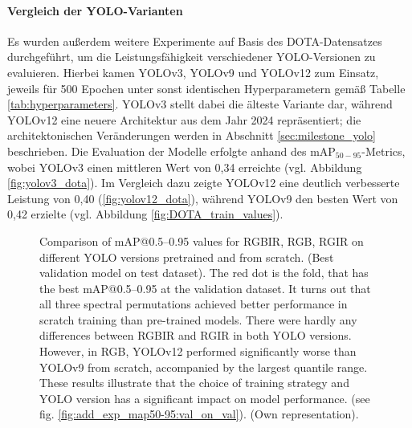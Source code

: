 \paragraph{Vergleich der YOLO-Varianten}
Es wurden außerdem weitere Experimente auf Basis des DOTA-Datensatzes durchgeführt, um die Leistungsfähigkeit verschiedener YOLO-Versionen zu evaluieren. Hierbei kamen YOLOv3, YOLOv9 und YOLOv12 zum Einsatz, jeweils für 500 Epochen unter sonst identischen Hyperparametern gemäß Tabelle \ref{tab:hyperparameters}. YOLOv3 stellt dabei die älteste Variante dar, während YOLOv12 eine neuere Architektur aus dem Jahr 2024 repräsentiert; die architektonischen Veränderungen werden in Abschnitt \ref{sec:milestone_yolo}  beschrieben. Die Evaluation der Modelle erfolgte anhand des mAP$_{50-95}$-Metrics, wobei YOLOv3 einen mittleren Wert von 0,34 erreichte (vgl. Abbildung \ref{fig:yolov3_dota}). Im Vergleich dazu zeigte YOLOv12 eine deutlich verbesserte Leistung von 0,40 (\ref{fig:yolov12_dota}), während YOLOv9 den besten Wert von 0,42 erzielte (vgl. Abbildung \ref{fig:DOTA_train_values}). %


\begin{figure}[htbp]
    \centering
    
    \caption[Comparison of \acrshort{mAP}@0.5--0.95 values for RGBIR, RGB, RGIR on different YOLO versions pretrained and from scratch (Best validation model on test dataset)]{Comparison of \acrshort{mAP}@0.5--0.95 values for RGBIR, RGB, RGIR on different YOLO versions pretrained and from scratch. (Best validation model on test dataset). The red dot is the fold, that has the best \acrshort{mAP}@0.5--0.95 at the validation dataset. It turns out that all three spectral permutations achieved better performance in scratch training than pre-trained models. There were hardly any differences between RGBIR and RGIR in both YOLO versions. However, in RGB, YOLOv12 performed significantly worse than YOLOv9 from scratch, accompanied by the largest quantile range. These results illustrate that the choice of training strategy and YOLO version has a significant impact on model performance. (see fig. \ref{fig:add_exp_map50-95:val_on_val}).  (Own representation).}
    \label{fig:add_exp_map50-95:val_on_test}
\end{figure}

